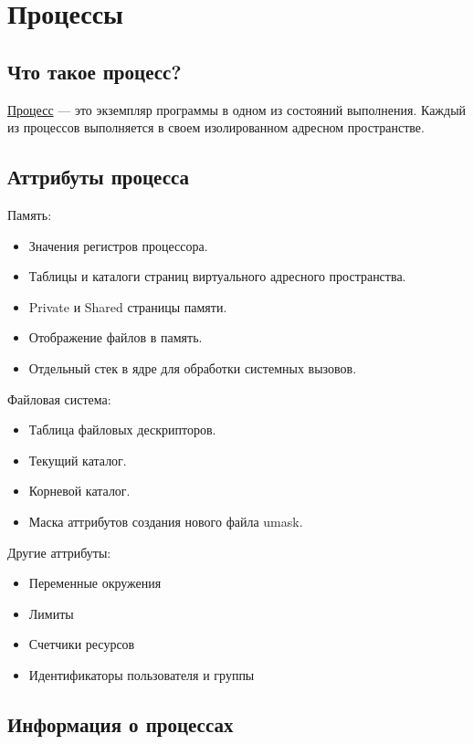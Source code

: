 \section{Процессы}

\subsection{Что такое процесс?}

\begin{Def}
	\underline{Процесс} --- это экземпляр программы в одном из состояний выполнения. Каждый
	из процессов выполняется в своем изолированном адресном пространстве.
\end{Def}

\subsection{Аттрибуты процесса}

Память:
\begin{itemize}
	\item Значения регистров процессора.
	\item Таблицы и каталоги страниц виртуального адресного пространства.
	\item Private и Shared страницы памяти.
	\item Отображение файлов в память.
	\item Отдельный стек в ядре для обработки системных вызовов.
\end{itemize}

Файловая система:
\begin{itemize}
	\item Таблица файловых дескрипторов.
	\item Текущий каталог.
	\item Корневой каталог.
	\item Маска аттрибутов создания нового файла umask. 
\end{itemize}

Другие аттрибуты:
\begin{itemize}
	\item Переменные окружения
	\item Лимиты
	\item Счетчики ресурсов
	\item Идентификаторы пользователя и группы
\end{itemize}

\subsection{Информация о процессах}


